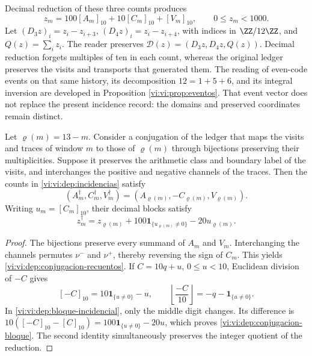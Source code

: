 Decimal reduction of these three counts produces
\begin{equation}
 z_m=100[A_m]_{10}+10[C_m]_{10}+[V_m]_{10},
 \qquad 0\le z_m<1000.
 \label{vi:vi:dep:bloque-incidencial}
\end{equation}
Let \((D_3z)_i=z_i-z_{i+3}\),
\((D_4z)_i=z_i-z_{i+4}\), with indices in \(\ZZ/12\ZZ\), and
\(Q(z)=\sum_i z_i\). The reader preserves
\(\mathcal D(z)=(D_3z,D_4z,Q(z))\). Decimal reduction forgets
multiples of ten in each count, whereas the original ledger preserves
the visits and transports that generated them.
The reading of even-code events on that same history,
its decomposition \(12=1+5+6\), and its integral inversion are
developed in Proposition \ref{vi:vi:prop:eventos}. That event
vector does not replace the present incidence record:
the domains and preserved coordinates remain distinct.

\begin{proposition}
\label{vi:vi:dep:conjugacion-incidencial}
Let \(\varrho(m)=13-m\). Consider a conjugation of the ledger
that maps the visits and traces of window \(m\) to those of
\(\varrho(m)\) through bijections preserving their multiplicities.
Suppose it preserves the arithmetic class and boundary label
of the visits, and interchanges the positive and negative channels of the
traces. Then the counts in \eqref{vi:vi:dep:incidencias} satisfy
\begin{equation}
 (A_m^\dagger,C_m^\dagger,V_m^\dagger)
 =(A_{\varrho(m)},-C_{\varrho(m)},V_{\varrho(m)}).
 \label{vi:vi:dep:conjugacion-recuentos}
\end{equation}
Writing \(u_m=[C_m]_{10}\), their decimal blocks satisfy
\begin{equation}
 z_m^\dagger=z_{\varrho(m)}
       +100\mathbf1_{\{u_{\varrho(m)}\ne0\}}-20u_{\varrho(m)}.
 \label{vi:vi:dep:conjugacion-bloque}
\end{equation}
\end{proposition}
\begin{proof}
The bijections preserve every summand of \(A_m\) and \(V_m\).
Interchanging the channels permutes \(\nu^-\) and \(\nu^+\),
thereby reversing the sign of \(C_m\). This yields
\eqref{vi:vi:dep:conjugacion-recuentos}. If \(C=10q+u\),
\(0\le u<10\), Euclidean division of \(-C\) gives
\[
 [-C]_{10}=10\mathbf1_{\{u\ne0\}}-u,
 \qquad
 \left\lfloor\frac{-C}{10}\right\rfloor
 =-q-\mathbf1_{\{u\ne0\}}.
\]
In \eqref{vi:vi:dep:bloque-incidencial}, only the middle digit
changes. Its difference is
\(10([-C]_{10}-[C]_{10})=100\mathbf1_{\{u\ne0\}}-20u\),
which proves \eqref{vi:vi:dep:conjugacion-bloque}. The second
identity simultaneously preserves the integer quotient of the reduction.
\end{proof}

